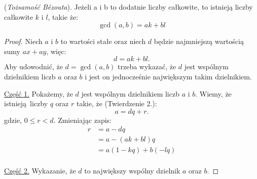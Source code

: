 \begin{theorem}
  (\textit{Tożsamość Bézouta}).
  Jeżeli a i b to dodatnie liczby całkowite,
  to istnieją liczby całkowite $k$ i $l$, takie że:
  \[
    \gcd(a, b) = ak + bl
  \]
\end{theorem}

\begin{proof}
  Niech $a$ i $b$ to wartości stałe
  oraz niech $d$ będzie najmniejszą wartością
  sumy $ax + ay$, więc:
  \begin{equation}
    d = ak + bl.
  \end{equation}
  Aby udowodnić, że $d = \gcd(a, b)$ trzeba wykazać,
  że $d$ jest wspólnym dzielnikiem liczb $a$ oraz $b$
  i jest on jednocześnie największym takim dzielnikiem.

  \vspace{1em}

  \noindent\underline{Część 1.}
  Pokażemy, że $d$ jest wspólnym dzielnikiem liczb $a$ i $b$.
  Wiemy, że istnieją liczby $q$ oraz $r$ takie, że (Twierdzenie 2.):
  \[
    a = dq + r
  .\]
  gdzie, $0 \leq r < d$. Zmieniając zapis:
  \begin{align*}
    r &= a - dq \\ %
      &= a - (ak + bl)q \\
      &= a(1 - kq) + b(-lq) \\
  \end{align*}

  \vspace{1em}

  \noindent\underline{Część 2.}
  Wykazanie, że $d$ to największy wspólny dzielnik $a$ oraz $b$.

\end{proof}
